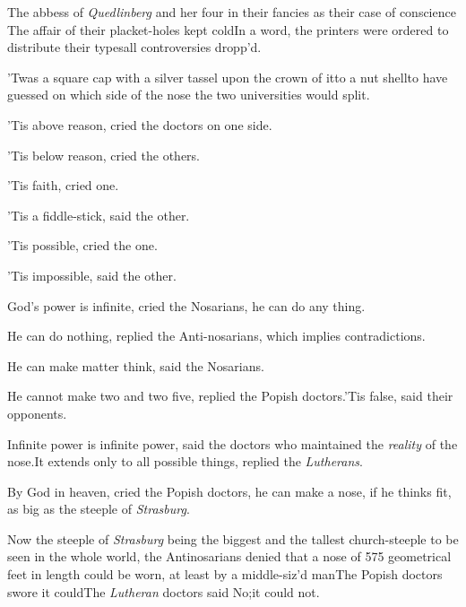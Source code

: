 \documentclass{article}
\begin{document}
\vskip -2pt

The abbess of \textit{Quedlinberg} and her four 
in their fancies as their case of conscience\break
\tsk The affair of their placket-holes kept
cold\tsk In a word, the printers were ordered to distribute their
types\tsk all controversies dropp’d.

\vskip -2pt

’Twas a square cap with a silver tassel upon the crown of
it\tsk to a nut shell\tsk\break to have guessed on which side of the
nose the two universities would split.

\vskip -2pt

’Tis above reason, cried the doctors on one side.

\vskip -2pt

’Tis below reason, cried the others.

\vskip -2pt

’Tis faith, cried one.

’Tis a fiddle-stick, said the other.

’Tis possible, cried the one.

’Tis impossible, said the other.

God’s power is infinite, cried the No\-sarians, he can do
any thing.

He can do nothing, replied the Anti-nosarians, which implies
contradictions.

He can make matter think, said the Nosarians.


\break
{}

He cannot make two and two five, replied the Popish
doctors.\tsh ’Tis false, said their opponents.\tsk

Infinite power is infinite power, said the doctors who
maintained the \textit{reality}
of the nose.\tsh It extends only to
all possible things, replied the \textit{Lutherans}.

By God in heaven, cried the Popish doctors, he can make a nose,
if he thinks fit, as big as the steeple of \textit{Strasburg}.

Now the steeple of \textit{Strasburg} being the biggest and the
tallest church-steeple to be seen in the whole world, the
Antino\-sarians denied that a nose of 575 geome\-trical feet in length
could be worn, at least by a middle-siz’d
man\tsk The Popish doctors swore it could\tsk The
\textit{Lutheran} doctors said No;\tsk it could not.
\end{document}
